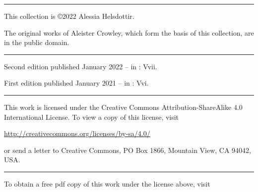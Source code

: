 {
\vspace*{\fill}
\begin{center}
  \rule{1in}{0.5pt}
\end{center}

This collection is \copyright 2022 Alessia Helsdottir.

\vspace{\baselineskip}

The original works of Aleister Crowley, which form the basis of this collection, are in the public domain.

\begin{center}
  \rule{1in}{0.5pt}
\end{center}

Second edition published January 2022 -- \Sun{} in \varCapricorn{} : Vvii.

\vspace{\baselineskip}

First edition published January 2021 -- \Sun{} in \varCapricorn{} : Vvi.

\begin{center}
  \rule{1in}{0.5pt}
\end{center}

\begin{center}
\end{center}

This work is licensed under the Creative Commons Attribution-ShareAlike 4.0 International License. To view a copy of this license, visit

\begin{center} \url{http://creativecommons.org/licenses/by-sa/4.0/} \end{center}

or send a letter to Creative Commons, PO Box 1866, Mountain View, CA 94042, USA.

\begin{center}
  \rule{1in}{0.5pt}
\end{center}

To obtain a free pdf copy of this work under the license above, visit

}
